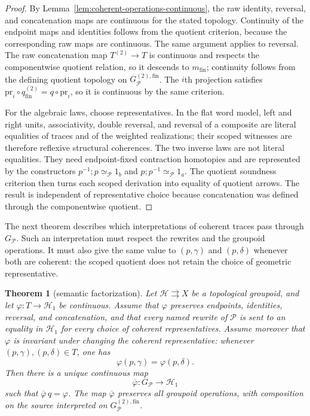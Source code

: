 \documentclass[10pt,reqno]{amsart}
\theoremstyle{definition}
\theoremstyle{plain}
\newtheorem{theorem}[definition]{Theorem}
\theoremstyle{remark}
\newcommand{\RwEq}{\mathrel{\simeq_{\!\mathcal P}}}
\newcommand{\Fin}{\mathrm{fin}}
\begin{document}
\begin{proof}
By Lemma~\ref{lem:coherent-operations-continuous}, the raw identity,
reversal, and concatenation maps are continuous for the stated topology.
Continuity of the endpoint maps and identities follows from the quotient
criterion, because the corresponding raw maps are continuous.  The same
argument applies to reversal.  The raw concatenation map
$T^{(2)}\to T$ is continuous and respects the componentwise quotient
relation, so it descends to $m_{\Fin}$; continuity follows from the defining
quotient topology on $G_{\mathcal P}^{(2),\Fin}$.  The $i$th projection
satisfies $\mathrm{pr}_i\circ q_{\Fin}^{(2)}=q\circ\mathrm{pr}_i$, so it is
continuous by the same criterion.

For the algebraic laws, choose representatives.  In the flat word model,
left and right units, associativity, double reversal, and reversal of a
composite are literal equalities of traces and of the weighted realizations;
their scoped witnesses are therefore reflexive structural coherences.  The
two inverse laws are not literal equalities.  They need endpoint-fixed
contraction homotopies and are represented by the constructors $p^{-1};p\RwEq 1_b$ and
$p;p^{-1}\RwEq 1_a$.  The quotient soundness criterion then turns each
scoped derivation into equality of quotient arrows.
The result is independent of representative choice because concatenation was
defined through the componentwise quotient.
\end{proof}



The next theorem describes which interpretations of coherent traces pass
through $G_{\mathcal P}$.  Such an interpretation must respect the rewrites
and the groupoid operations.  It must also give the same value to
$(p,\gamma)$ and $(p,\delta)$ whenever both are coherent: the scoped quotient
does not retain the choice of geometric representative.

\begin{theorem}[semantic factorization]\label{thm:semantic-factorization}
Let $\mathcal H\rightrightarrows X$ be a topological groupoid, and let
$\varphi:T\to\mathcal H_1$ be continuous.  Assume that $\varphi$ preserves
endpoints, identities, reversal, and concatenation, and that every named
rewrite of $\mathcal P$ is sent to an equality in $\mathcal H_1$ for every
choice of coherent representatives.  Assume moreover that $\varphi$ is
invariant under changing the coherent representative: whenever
$(p,\gamma),(p,\delta)\in T$, one has
\[
  \varphi(p,\gamma)=\varphi(p,\delta).
\]
Then there is a unique continuous map
\[
  \overline{\varphi}:G_{\mathcal P}\longrightarrow\mathcal H_1
\]
such that $\overline{\varphi}\,q=\varphi$.  The map
$\overline{\varphi}$ preserves all groupoid operations, with composition on
the source interpreted on $G_{\mathcal P}^{(2),\Fin}$.
\end{theorem}
\end{document}
